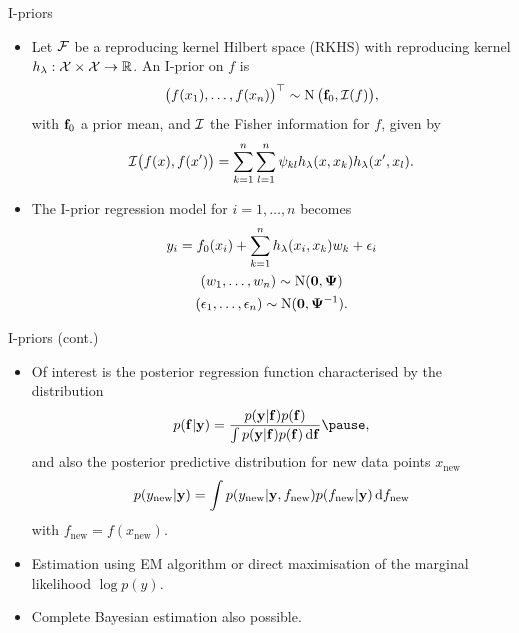 \begin{frame}{I-priors}
  \vspace{-16pt}
  \begin{itemize}\setlength\itemsep{0.3em}
    \item Let ${\mathcal F}$ be a reproducing kernel Hilbert space (RKHS) with reproducing kernel $h_\lambda: {\mathcal X} \times {\mathcal X} \rightarrow \mathbb{R}$. An I-prior on $f$ is
    \[
      \big(f(x_1), \dots, f(x_n)\big)^\top \sim \operatorname{N}\big({\mathbf f}_0, {\mathcal I}(f)\big),
    \] 
    with ${\mathbf f}_0$ a prior mean, and ${\mathcal I}$ the Fisher information for $f$, given by
    \[
      {\mathcal I}\big(f(x), f(x')\big) = \sum_{k=1}^n\sum_{l=1}^n \psi_{kl} h_\lambda(x,x_k) h_\lambda(x',x_l).
    \]
    \pause
    \item The I-prior regression model for $i = 1,\dots,n$ becomes
    \begin{align}
      \begin{gathered}
        y_i = f_0(x_i) + \sum_{k=1}^n h_\lambda(x_i, x_k)w_k + \epsilon_i \\
        (w_1, \dots, w_n) \sim \operatorname{N}({\mathbf 0}, {\bm\Psi}) \\
        (\epsilon_1, \dots, \epsilon_n) \sim \operatorname{N}({\mathbf 0}, {\bm\Psi}^{-1}).
      \end{gathered}    
    \end{align}
  \end{itemize}
  \vspace{2pt}
\end{frame}

\begin{frame}{I-priors (cont.)}
  \vspace{-5pt}
  \begin{itemize}\setlength\itemsep{0.8em}
    \item Of interest is the posterior regression function characterised by the distribution
    \[
      p(\bff | \by ) = \frac{p(\by | \bff) p(\bff)}{\int p(\by | \bff) p(\bff) \d\bff} \pause,
    \]
    and also the posterior predictive distribution for new data points $x_{\text{new}}$
    \[
      p(y_{\text{new}} | {\mathbf y}) = \int p(y_{\text{new}} | {\mathbf y}, f_{\text{new}}) p(f_{\text{new}} | {\mathbf y} ) \, \text{d} f_{\text{new}}
    \]
    with $f_{\text{new}} = f(x_{\text{new}})$.
    \pause
    \item Estimation using EM algorithm or direct maximisation of the marginal likelihood $\log p(y)$.
    \item Complete Bayesian estimation also possible.
  \end{itemize}
  \vspace{5pt}
\end{frame}


